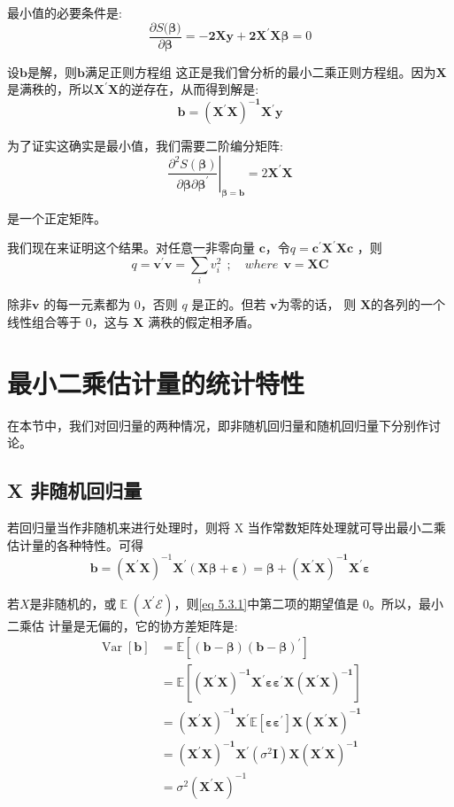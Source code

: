   最小值的必要条件是:
   $$ \frac{\partial S( \boldsymbol{\beta)} }{\partial \boldsymbol{\beta}}=-\boldsymbol{ 2 X y+2 X^{\prime} X \beta }=0 $$
   
   设$ \boldsymbol{b} $是解，则$ \boldsymbol{b} $满足正则方程组
   这正是我们曾分析的最小二乘正则方程组。因为$ \boldsymbol{X} $是满秩的，所以$ \boldsymbol{X^{\prime}X} $的逆存在，从而得到解是:
   $$ \boldsymbol{b=\left(X^{\prime} X\right)^{-1} X^{\prime} y} $$

   为了证实这确实是最小值，我们需要二阶编分矩阵:
   $$ \left.\frac{\partial^{2} S(\boldsymbol{\beta})}{\partial \boldsymbol{\beta} \partial \boldsymbol{\beta^{\prime}}}\right|_{\boldsymbol{\beta=b}}
        =2 \boldsymbol{X^{\prime} X} $$

   是一个正定矩阵。

   我们现在来证明这个结果。对任意一非零向量 $ \boldsymbol{c} $，令$ q = \boldsymbol{c^{\prime}X^{\prime}Xc} $ ，则
   $$ q=\boldsymbol{v^{\prime} v}=\sum_{i} v_{i}^{2} \ \  ;\quad where   \ \ \boldsymbol{v=X{C}} $$

   除非$ \boldsymbol{v} $ 的每一元素都为 0，否则 $ q $ 是正的。但若 $ \boldsymbol{v} $为零的话，
   则 $ \boldsymbol{X} $的各列的一个线性组合等于 0，这与 $ \boldsymbol{X} $ 满秩的假定相矛盾。
\section{最小二乘估计量的统计特性}
在本节中，我们对回归量的两种情况，即非随机回归量和随机回归量下分别作讨论。
\subsection{ X  非随机回归量}

若回归量当作非随机来进行处理时，则将 X 当作常数矩阵处理就可导出最小二乘估计量的各种特性。可得
\begin{equation}
    \boldsymbol{b} = \left( \boldsymbol{ X^{\prime} X } \right)^{-1} 
     \boldsymbol{ X^{\prime}(X \beta+\varepsilon)=\beta+\left(X^{\prime} X\right)^{-1} X^{\prime} \varepsilon}
    \label{eq 5.3.1}
\end{equation}

若$ X $是非随机的，或$ \operatorname{\mathbb{E}} \left(X^{\prime} \mathcal{E}\right) $，则\ref{eq 5.3.1}中第二项的期望值是 0。所以，最小二乘估 计量是无偏的，它的协方差矩阵是:
$$ \begin{aligned}
    \operatorname{Var}[\boldsymbol{b}] &= \mathbb{E}\left[\boldsymbol{(b-\beta)(b-\beta)^{\prime}}\right] \\
    &=\mathbb{E} \boldsymbol{\left[\left(X^{\prime} X\right)^{-1} X^{\prime} \varepsilon \varepsilon^{\prime} X\left(X^{\prime} X\right)^{-1}\right]} \\
    &=\boldsymbol{\left(X^{\prime} X\right)^{-1} X^{\prime}} \mathbb{E} \boldsymbol{\left[\varepsilon \varepsilon^{\prime}\right] X\left(X^{\prime} X\right)^{-1}} \\
    &=\boldsymbol{\left(X^{\prime} X\right)^{-1} X^{\prime}}\left(\sigma^{2} \boldsymbol{I}\right) \boldsymbol{X\left(X^{\prime} X\right)^{-1}} \\
    &=\sigma^{2}\left(\boldsymbol{X^{\prime} X}\right)^{-1}
    \end{aligned} $$

